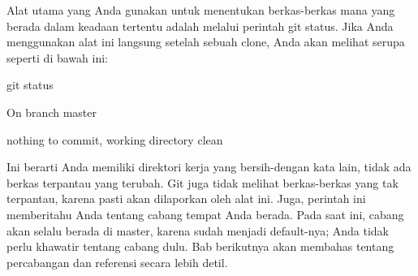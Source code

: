  \par
\noindent 
{\fontsize{14pt}{14pt}\selectfont Alat utama yang Anda gunakan untuk menentukan berkas-berkas mana yang berada dalam keadaan tertentu adalah melalui perintah $  $git status. Jika Anda menggunakan alat ini langsung setelah sebuah $  $clone, Anda akan melihat serupa seperti di bawah ini: \\} \par
\noindent 
{\fontsize{14pt}{14pt}\selectfont git status \\} \par
\noindent 
{\fontsize{14pt}{14pt}\selectfont On branch master \\} \par
\noindent 
{\fontsize{14pt}{14pt}\selectfont nothing to commit, working directory clean \\} \par
\noindent 
{\fontsize{14pt}{14pt}\selectfont Ini berarti Anda memiliki direktori kerja yang bersih-dengan kata lain, tidak ada berkas terpantau yang terubah. Git juga tidak melihat berkas-berkas yang tak terpantau, karena pasti akan dilaporkan oleh alat ini. Juga, perintah ini memberitahu Anda tentang cabang tempat Anda berada. Pada saat ini, cabang akan selalu berada di master, karena sudah menjadi default-nya; Anda tidak perlu khawatir tentang cabang dulu. Bab berikutnya akan membahas tentang percabangan dan referensi secara lebih detil. \\} \par

